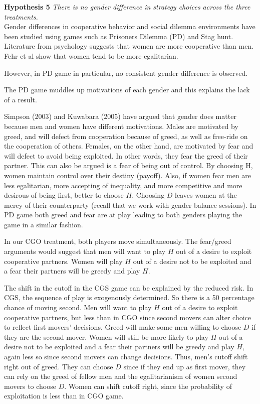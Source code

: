 \documentclass[12pt,english]{article}
\begin{document}
\noindent \textbf{Hypothesis 5}
\textit{There is no gender difference in strategy choices across the three treatments.}\\

Gender differences in cooperative behavior and social dilemma environments have been studied using games such as Prisoners Dilemma (PD) and Stag hunt. Literature from psychology suggests that women are more cooperative
than men. Fehr et al show that women tend to be more egalitarian. 

However, in PD game in particular, no consistent gender difference is observed. 

The PD game muddles up motivations of each gender and this explains the lack of a result.

Simpson (2003) and Kuwabara (2005) have argued that gender does matter because men and women have different motivations. Males are motivated by greed, and will defect from cooperation because of greed, as well as free-ride on the cooperation of others. Females, on the other hand, are motivated by fear and will defect
to avoid being exploited. In other words, they fear the greed of their partner. 
This can also be argued is a fear of being out of control. By choosing H, women maintain control over their destiny (payoff). Also, if women fear men are less egalitarian, more accepting of inequality, and
more competitive and more desirous of being first, better to choose $H$. Choosing $D$ leaves women at the mercy of their counterparty (recall that we work with gender balance sessions). In PD game both greed and fear
are at play leading to both genders playing the game in a similar fashion.

In our CGO treatment, both players move simultaneously. The fear/greed arguments would suggest that men will want to play $H$ out of a desire to exploit cooperative partners. Women will play $H$ out of a desire not to be exploited and a fear their partners will be greedy and play $H$.

The shift in the cutoff in the CGS game can be explained by the reduced risk. In CGS, the sequence of play is exogenously determined. So there is a 50 percentage chance of moving second. Men will want to play $H$ out of a desire to exploit cooperative partners, but less than in CGO since second movers can alter choice to reflect first movers’ decisions. Greed will make some men willing to choose $D$ if they are the second mover. Women will still be more likely to play $H$ out of a desire not to be exploited and a fear their partners will be greedy and play $H$, again less so since second movers can change decisions.  Thus, men's cutoff shift right out of greed. They can choose $D$ since if they end up as first mover, they can rely on the greed of fellow men and the egalitarianism of women second movers to choose $D$. Women can shift cutoff right, since the probability of exploitation is less than in CGO game. 
\end{document}

